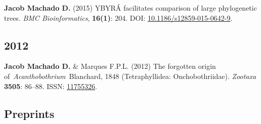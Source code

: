 \documentclass[11pt, letterpaper, sans]{moderncv}
\begin{document}
    {\setlength{\parskip}{.5em}\renewcommand{\baselinestretch}{2.0}\begin{hangparas}{.25in}{1}
		\textbf{Jacob Machado D.} (2015) YBYRÁ facilitates comparison of large phylogenetic trees. \emph{BMC Bioinformatics}, \textbf{16(1)}: 204. DOI: \href{https://doi.org/10.1186/s12859-015-0642-9}{10.1186/s12859-015-0642-9}.
	\end{hangparas}}


\subsection{2012}

    {\setlength{\parskip}{.5em}\renewcommand{\baselinestretch}{2.0}\begin{hangparas}{.25in}{1}
		\textbf{Jacob Machado D.} \& Marques F.P.L. (2012) The forgotten origin of~\emph{Acanthobothrium}~Blanchard, 1848 (Tetraphyllidea: Onchobothriidae). \emph{Zootaxa} \textbf{3505}: 86--88. ISSN: \href{http://www.mapress.com/zootaxa/2012/f/z03505p088f.pdf}{11755326}.
	\end{hangparas}}


%


\subsection{Preprints}
\end{document}
